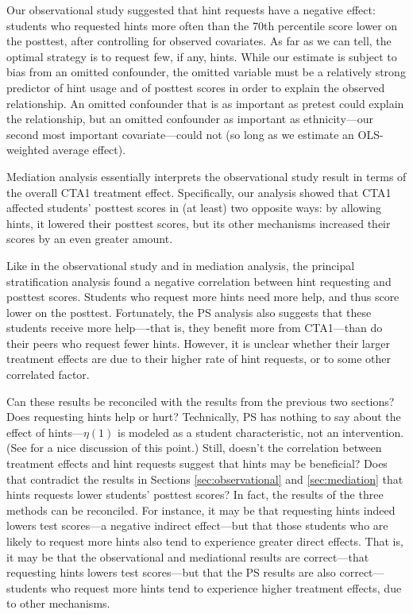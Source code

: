 \documentclass{article}\usepackage[]{graphicx}\usepackage[]{color}
\begin{document}
Our observational study suggested that hint requests have a negative effect: students who
requested hints more often than the 70th
percentile score lower on the posttest, after controlling for observed
covariates.
As far as we can tell, the optimal strategy is to request few, if any, hints.
While our estimate is subject to bias from an omitted confounder, the omitted variable must be a relatively strong predictor of hint usage and of posttest scores in order to explain the observed relationship.
An omitted confounder that is as important as pretest could explain the relationship, but an omitted confounder as important as ethnicity---our second most important covariate---could not (so long as we estimate an OLS-weighted average effect).

Mediation analysis essentially interprets the observational study result in terms of the
overall CTA1 treatment effect.
Specifically, our analysis showed that CTA1 affected students'
posttest scores in (at least) two opposite ways: by allowing hints, it
lowered their posttest scores, but its other mechanisms increased
their scores by an even greater amount.

Like in the observational study and in mediation analysis, the
principal stratification analysis found a negative correlation
between hint requesting and posttest scores.
Students who request more hints need more help, and thus score lower
on the posttest.
Fortunately, the PS analysis also suggests that these students
receive more help----that is, they benefit more from CTA1---than do their peers who request fewer hints.
However, it is unclear whether their larger treatment effects are due to their higher rate of hint requests, or to some other correlated factor.

Can these results be reconciled with the results from the previous two
sections?
Does requesting hints help or hurt?
Technically, PS has nothing to say about the effect of hints---$\eta(1)$
is modeled as a student characteristic, not an intervention.
(See \citealt{jin2008principal} for a nice discussion of this point.)
Still, doesn't the correlation between treatment effects and hint
requests suggest that hints may be beneficial?
Does that contradict the results in Sections \ref{sec:observational}
and \ref{sec:mediation} that hints requests lower students' posttest
scores?
In fact, the results of the three methods can be reconciled.
For instance, it may be that requesting hints indeed lowers test
scores---a negative indirect effect---but that those students who are
likely to request more hints also tend to experience greater direct
effects.
That is, it may be that the observational and mediational results are
correct---that requesting hints lowers test scores---but that the PS
results are also correct---students who request more hints tend to
experience higher treatment effects, due to other mechanisms.
\end{document}
